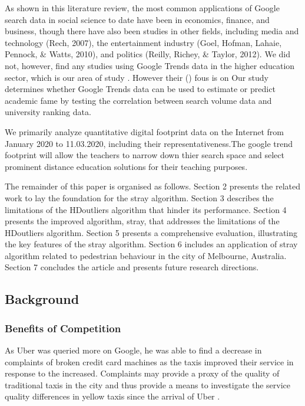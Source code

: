 \documentclass[11pt,a4paper,]{article}
\begin{document}
As shown in this literature review, the most common applications of Google search data in social science to date have been in economics, finance, and business, though there have also been studies in other fields, including media and technology (Rech, 2007), the entertainment industry (Goel, Hofman, Lahaie, Pennock, \& Watts, 2010), and politics (Reilly, Richey, \& Taylor, 2012). We did not, however, find any studies using Google Trends data in the higher education sector, which is our area of study \autocite{vaughan2014web}. However their (\textcite{vaughan2014web}) fous is on Our study determines whether Google Trends data can be used to estimate or predict academic fame by testing the correlation between search volume data and university ranking data.

We primarily analyze quantitative digital footprint data on the Internet from January 2020 to 11.03.2020, including their representativeness.The google trend footprint will allow the teachers to narrow down thier search space and select prominent distance education solutions for their teaching purposes.

The remainder of this paper is organised as follows. Section 2 presents the related work to lay the foundation for the stray algorithm. Section 3 describes the limitations of the HDoutliers algorithm that hinder its performance. Section 4 presents the improved algorithm, stray, that addresses the limitations of the HDoutliers algorithm. Section 5 presents a comprehensive evaluation, illustrating the key features of the stray algorithm. Section 6 includes an application of stray algorithm related to pedestrian behaviour in the city of Melbourne, Australia. Section 7 concludes the article and presents future research directions.

\hypertarget{background}{%
\subsection{Background}\label{background}}

\hypertarget{benefits-of-competition}{%
\subsubsection{Benefits of Competition}\label{benefits-of-competition}}

As Uber was queried more on Google, he was able to find a decrease in complaints of broken credit card machines as the taxis improved their service in response to the increased. Complaints may provide a proxy of the quality of traditional taxis in the city and thus provide a means to investigate the service quality differences in yellow taxis since the arrival of Uber \autocite{willis2020using}.
\end{document}
